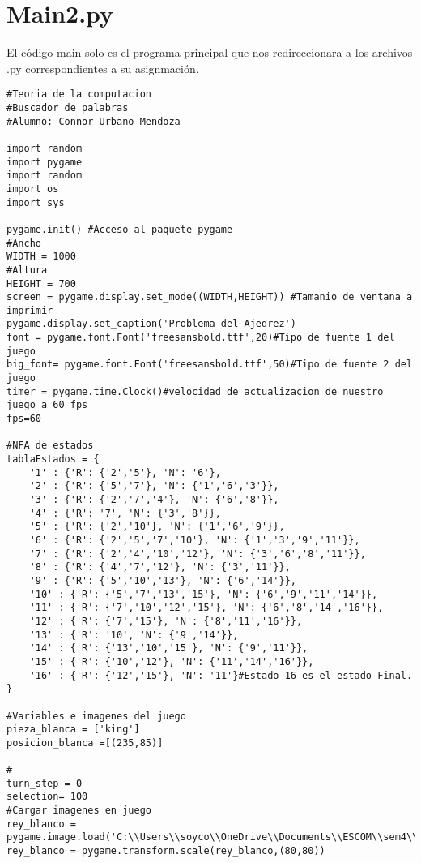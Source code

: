 \section{Main2.py}
El código main solo es el programa principal que nos redireccionara a los archivos .py correspondientes a su asignmación. \newline
\\
\begin{lstlisting}
#Teoria de la computacion
#Buscador de palabras
#Alumno: Connor Urbano Mendoza

import random
import pygame
import random
import os
import sys

pygame.init() #Acceso al paquete pygame
#Ancho
WIDTH = 1000
#Altura
HEIGHT = 700
screen = pygame.display.set_mode((WIDTH,HEIGHT)) #Tamanio de ventana a imprimir
pygame.display.set_caption('Problema del Ajedrez')
font = pygame.font.Font('freesansbold.ttf',20)#Tipo de fuente 1 del juego
big_font= pygame.font.Font('freesansbold.ttf',50)#Tipo de fuente 2 del juego
timer = pygame.time.Clock()#velocidad de actualizacion de nuestro juego a 60 fps
fps=60

#NFA de estados
tablaEstados = {
    '1' : {'R': {'2','5'}, 'N': '6'},
    '2' : {'R': {'5','7'}, 'N': {'1','6','3'}},
    '3' : {'R': {'2','7','4'}, 'N': {'6','8'}},
    '4' : {'R': '7', 'N': {'3','8'}},
    '5' : {'R': {'2','10'}, 'N': {'1','6','9'}},
    '6' : {'R': {'2','5','7','10'}, 'N': {'1','3','9','11'}},
    '7' : {'R': {'2','4','10','12'}, 'N': {'3','6','8','11'}},
    '8' : {'R': {'4','7','12'}, 'N': {'3','11'}},
    '9' : {'R': {'5','10','13'}, 'N': {'6','14'}},
    '10' : {'R': {'5','7','13','15'}, 'N': {'6','9','11','14'}},
    '11' : {'R': {'7','10','12','15'}, 'N': {'6','8','14','16'}},
    '12' : {'R': {'7','15'}, 'N': {'8','11','16'}},
    '13' : {'R': '10', 'N': {'9','14'}},
    '14' : {'R': {'13','10','15'}, 'N': {'9','11'}},
    '15' : {'R': {'10','12'}, 'N': {'11','14','16'}},
    '16' : {'R': {'12','15'}, 'N': '11'}#Estado 16 es el estado Final.
}

#Variables e imagenes del juego
pieza_blanca = ['king']
posicion_blanca =[(235,85)]

#
turn_step = 0
selection= 100
#Cargar imagenes en juego
rey_blanco = pygame.image.load('C:\\Users\\soyco\\OneDrive\\Documents\\ESCOM\\sem4\\Teoria\\P2\\Chess\\img\\white_king.png')
rey_blanco = pygame.transform.scale(rey_blanco,(80,80))


\end{lstlisting}
